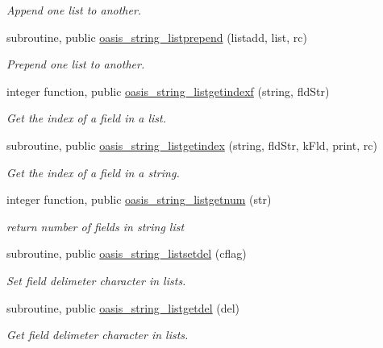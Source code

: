 \begin{DoxyCompactItemize}
\begin{DoxyCompactList}\small\item\em Append one list to another. \end{DoxyCompactList}\item 
subroutine, public \hyperlink{classmod__oasis__string_a7df42cce90ae7fa5eceb0b9f2e4bf169}{oasis\+\_\+string\+\_\+listprepend} (listadd, list, rc)
\begin{DoxyCompactList}\small\item\em Prepend one list to another. \end{DoxyCompactList}\item 
integer function, public \hyperlink{classmod__oasis__string_a66bedb9c90f129c44087bf3f3c26bdb7}{oasis\+\_\+string\+\_\+listgetindexf} (string, fld\+Str)
\begin{DoxyCompactList}\small\item\em Get the index of a field in a list. \end{DoxyCompactList}\item 
subroutine, public \hyperlink{classmod__oasis__string_a6e2bf29a9030f16e3a58d0302ab793f2}{oasis\+\_\+string\+\_\+listgetindex} (string, fld\+Str, k\+Fld, print, rc)
\begin{DoxyCompactList}\small\item\em Get the index of a field in a string. \end{DoxyCompactList}\item 
integer function, public \hyperlink{classmod__oasis__string_a15a49e6a71df520424402a753be10bb1}{oasis\+\_\+string\+\_\+listgetnum} (str)
\begin{DoxyCompactList}\small\item\em return number of fields in string list \end{DoxyCompactList}\item 
subroutine, public \hyperlink{classmod__oasis__string_a4229e0726d97fc10f17027caea332daf}{oasis\+\_\+string\+\_\+listsetdel} (cflag)
\begin{DoxyCompactList}\small\item\em Set field delimeter character in lists. \end{DoxyCompactList}\item 
subroutine, public \hyperlink{classmod__oasis__string_a0ed07993c2e7d09baffe933c6075f154}{oasis\+\_\+string\+\_\+listgetdel} (del)
\begin{DoxyCompactList}\small\item\em Get field delimeter character in lists. \end{DoxyCompactList}\item 

\end{DoxyCompactItemize}
